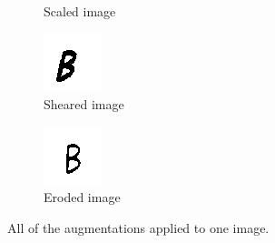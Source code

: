 \documentclass{article}
\begin{document}
\begin{figure}
\begin{subfigure}{0.11\textwidth}
  \caption{Scaled image}
\end{subfigure}
\begin{subfigure}{0.11\textwidth}
  \centering
  \includegraphics[width=\linewidth]{images/sheared}
  \caption{Sheared image}
\end{subfigure}
\begin{subfigure}{0.11\textwidth}
  \centering
  \includegraphics[width=\linewidth]{images/eroded}
  \caption{Eroded image}
\end{subfigure}
\caption{All of the augmentations applied to one image.}
\label{fig:augmented}
\end{figure}
\end{document}

